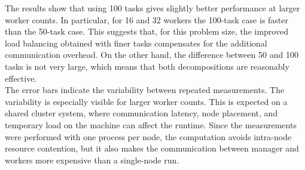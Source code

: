 \documentclass[unicode,10pt,a4paper,oneside,numbers=endperiod,openany]{scrartcl}
\begin{document}
The results show that using 100 tasks gives slightly better performance at larger worker counts. In particular, for 16 and 32 workers the 100-task case is faster than the 50-task case. This suggests that, for this problem size, the improved load balancing obtained with finer tasks compensates for the additional communication overhead. On the other hand, the difference between 50 and 100 tasks is not very large, which means that both decompositions are reasonably effective.\\

The error bars indicate the variability between repeated measurements. The variability is especially visible for larger worker counts. This is expected on a shared cluster system, where communication latency, node placement, and temporary load on the machine can affect the runtime. Since the measurements were performed with one process per node, the computation avoids intra-node resource contention, but it also makes the communication between manager and workers more expensive than a single-node run.
\printbibliography
\end{document}
